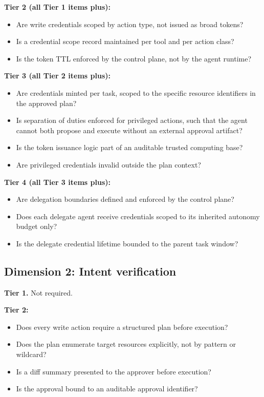 \documentclass[11pt]{article}
\begin{document}
\textbf{Tier 2 (all Tier 1 items plus):}
\begin{itemize}
  \item Are write credentials scoped by action type, not issued as broad tokens?
  \item Is a credential scope record maintained per tool and per action class?
  \item Is the token TTL enforced by the control plane, not by the agent runtime?
\end{itemize}

\textbf{Tier 3 (all Tier 2 items plus):}
\begin{itemize}
  \item Are credentials minted per task, scoped to the specific resource identifiers in the approved plan?
  \item Is separation of duties enforced for privileged actions, such that the agent cannot both propose and execute without an external approval artifact?
  \item Is the token issuance logic part of an auditable trusted computing base?
  \item Are privileged credentials invalid outside the plan context?
\end{itemize}

\textbf{Tier 4 (all Tier 3 items plus):}
\begin{itemize}
  \item Are delegation boundaries defined and enforced by the control plane?
  \item Does each delegate agent receive credentials scoped to its inherited autonomy budget only?
  \item Is the delegate credential lifetime bounded to the parent task window?
\end{itemize}

\subsection{Dimension 2: Intent verification}

\textbf{Tier 1.} Not required.

\textbf{Tier 2:}
\begin{itemize}
  \item Does every write action require a structured plan before execution?
  \item Does the plan enumerate target resources explicitly, not by pattern or wildcard?
  \item Is a diff summary presented to the approver before execution?
  \item Is the approval bound to an auditable approval identifier?
\end{itemize}
\end{document}
